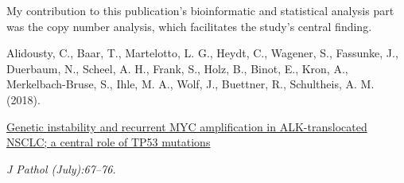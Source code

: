 \enlargethispage{\baselineskip}

\vfill
\noindent My contribution to this publication's bioinformatic and statistical
analysis part was the copy number analysis, which facilitates the study's
central finding.\nopagebreak
\medskip
\begin{tcolorbox}[
  boxrule=0pt, leftrule=1pt, colframe=s-blue, colback=white, sharp corners=all]%
  \raggedright
  Alidousty, C., Baar, T., Martelotto, L. G., Heydt, C., Wagener, S.,
  Fassunke, J., Duerbaum, N., Scheel, A. H., Frank, S., Holz, B., Binot, E.,
  Kron, A., Merkelbach-Bruse, S., Ihle, M. A., Wolf, J., Buettner, R.,
  Schultheis, A. M. (2018).
  
  \smallskip
  \href{http://doi.wiley.com/10.1002/path.5110}
    {Genetic instability and recurrent MYC amplification in ALK-translocated
    NSCLC; a central role of TP53 mutations}

  \smallskip
  \textit{J Pathol (July):67–76.}
\end{tcolorbox}


% 
% 

